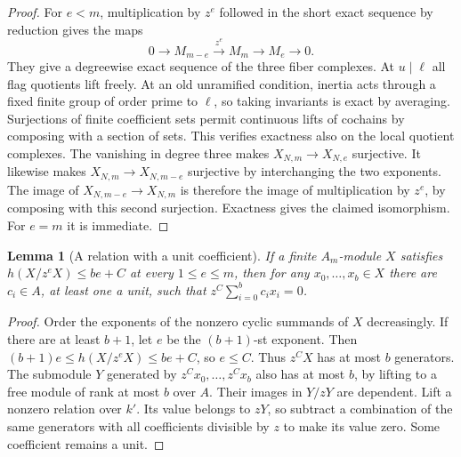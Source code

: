 \documentclass[a4paper,11pt]{article}
\newtheorem{lemma}[proposition]{Lemma}
\theoremstyle{definition}
\theoremstyle{remark}
\numberwithin{equation}{section}
\begin{document}
\begin{proof}
For \(e<m\), multiplication by \(z^e\) followed in the
short exact sequence by reduction gives the maps
\[
        0\longrightarrow M_{m-e}\xrightarrow{\,z^e\,}
        M_m\longrightarrow M_e\longrightarrow0 .
\]
They give a degreewise exact sequence of the three fiber
complexes. At \(u\mid\ell\) all flag quotients lift freely.
At an old unramified condition, inertia acts through a fixed
finite group of order prime to \(\ell\), so taking invariants
is exact by averaging. Surjections of finite coefficient sets
permit continuous lifts of cochains by composing with a
section of sets. This verifies exactness also on the local
quotient complexes. The vanishing in degree three makes
\(X_{N,m}\to X_{N,e}\) surjective. It likewise makes
\(X_{N,m}\to X_{N,m-e}\) surjective by interchanging the
two exponents. The image of \(X_{N,m-e}\to X_{N,m}\) is
therefore the image of multiplication by \(z^e\), by composing
with this second surjection. Exactness gives the claimed
isomorphism. For \(e=m\) it is immediate.
\end{proof}

\begin{lemma}[A relation with a unit coefficient]
\label{lem:primrelation369}
If a finite \(A_m\)-module \(X\) satisfies
\(h(X/z^eX)\le be+C\) at every \(1\le e\le m\), then for
any \(x_0,\ldots,x_b\in X\) there are \(c_i\in A\), at
least one a unit, such that \(z^C\sum_{i=0}^b c_i x_i=0\).
\end{lemma}
\begin{proof}
Order the exponents of the nonzero cyclic summands of \(X\)
decreasingly. If there are at least \(b+1\), let \(e\) be
the \((b+1)\)-st exponent. Then
\((b+1)e\le h(X/z^eX)\le be+C\), so \(e\le C\).
Thus \(z^CX\) has at most \(b\) generators. The submodule
\(Y\) generated by \(z^Cx_0,\ldots,z^Cx_b\) also has at
most \(b\), by lifting to a free module of rank at most
\(b\) over \(A\). Their images in \(Y/zY\) are dependent.
Lift a nonzero relation over \(k'\). Its value belongs to
\(zY\), so subtract a combination of the same generators
with all coefficients divisible by \(z\) to make its value
zero. Some coefficient remains a unit.
\end{proof}
\end{document}

